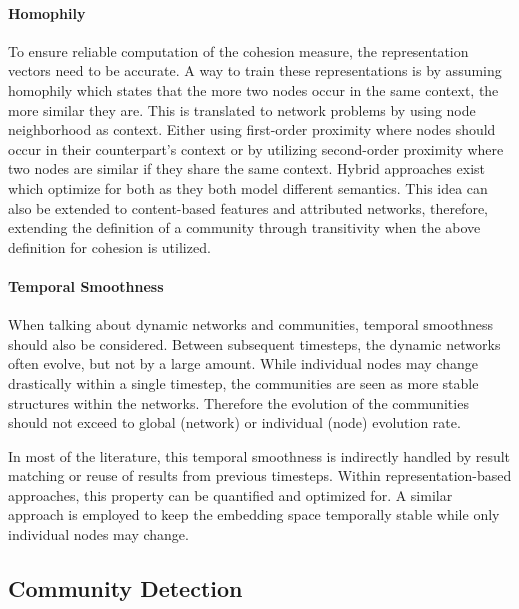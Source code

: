 \documentclass[
acmsmall,
nonacm,
screen,
acmthm]{../../scripts/pandoc/templates/acmart}
\begin{document}
\hypertarget{homophily}{%
\paragraph{Homophily}\label{homophily}}

To ensure reliable computation of the cohesion measure, the
representation vectors need to be accurate. A way to train these
representations is by assuming homophily which states that the more two
nodes occur in the same context, the more similar they are. This is
translated to network problems by using node neighborhood as context.
Either using first-order proximity where nodes should occur in their
counterpart's context or by utilizing second-order proximity where two
nodes are similar if they share the same context. Hybrid approaches
exist which optimize for both as they both model different semantics.
This idea can also be extended to content-based features and attributed
networks, therefore, extending the definition of a community through
transitivity when the above definition for cohesion is utilized.

\hypertarget{temporal-smoothness}{%
\paragraph{Temporal Smoothness}\label{temporal-smoothness}}

When talking about dynamic networks and communities, temporal smoothness
should also be considered. Between subsequent timesteps, the dynamic
networks often evolve, but not by a large amount. While individual nodes
may change drastically within a single timestep, the communities are
seen as more stable structures within the networks. Therefore the
evolution of the communities should not exceed to global (network) or
individual (node) evolution rate.

In most of the literature, this temporal smoothness is indirectly
handled by result matching or reuse of results from previous timesteps.
Within representation-based approaches, this property can be quantified
and optimized for. A similar approach is employed to keep the embedding
space temporally stable while only individual nodes may change.

\hypertarget{community-detection-2}{%
\subsection{Community Detection}\label{community-detection-2}}
\end{document}
